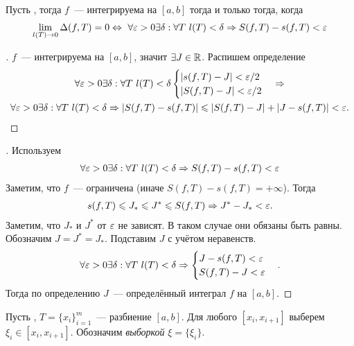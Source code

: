 \documentclass[../main.tex]{subfiles}
\begin{document}
\begin{proposition}
    Пусть \fabr, тогда $f$~--- интегрируема на $[a,b]$ тогда и только тогда, когда 
    \begin{gather*}
        \lim_{l(T) \to 0} \Delta(f, T) = 0 \Leftrightarrow~ \forall \varepsilon > 0 \exists \delta : \forall T\ l(T) < \delta \Rightarrow S(f, T) - s(f,T) < \varepsilon
    \end{gather*}
\end{proposition}


\begin{proof}[\circled{\hence}]
    $f$~--- интегрируема на $[a,b]$, значит $\exists J \in \mathbb{R}$. Распишем определение
    \begin{gather*}
        \forall \varepsilon > 0 \exists \delta : \forall T \ l(T) < \delta \begin{cases}|s(f,T) - J| < \varepsilon/2 \\ |S(f,T) - J| < \varepsilon/2\end{cases} \Rightarrow \\
        \forall \varepsilon > 0 \exists \delta : \forall T \ l(T) < \delta \Rightarrow |S(f,T) - s(f,T)| \leqslant |S(f,T) - J| + |J - s(f,T)| < \varepsilon.
    \end{gather*}
\end{proof}

\begin{proof}[\circled{\lhence}]
    Используем 
    \begin{gather*}
        \forall \varepsilon > 0 \exists \delta : \forall T\ l(T) < \delta \Rightarrow S(f, T) - s(f,T) < \varepsilon
    \end{gather*}
    Заметим, что $f$~--- ограничена (иначе $S(f,T) - s(f, T) = + \infty$). Тогда 
    \begin{gather*}
        s(f, T) \leqslant J_* \leqslant J^* \leqslant S(f, T) \Rightarrow J^* - J_* < \varepsilon.
    \end{gather*}
    Заметим, что $J_*$ и $J^*$ от $\varepsilon$ не зависят. В таком случае они обязаны быть равны. Обозначим $J = J^* = J_*$. Подставим $J$ с учётом неравенств. 
    \begin{gather*}
        \forall \varepsilon > 0 \exists \delta : \forall T\ l(T) < \delta \Rightarrow \begin{cases}J - s(f,T) < \varepsilon \\ S(f, T) - J < \varepsilon\end{cases}.
    \end{gather*}
    Тогда по определению $J$~--- определённый интеграл $f$ на $[a,b]$.
\end{proof}

\begin{definition}
    Пусть \fabr, $T = \{x_i\}_{i=1}^m$~--- разбиение $[a,b]$. Для любого $[x_i, x_{i+1}]$ выберем $\xi_i \in [x_i, x_{i+1}]$. Обозначим \emph{выборкой} $\xi = \{\xi_i\}$.
\end{definition}
\end{document}
